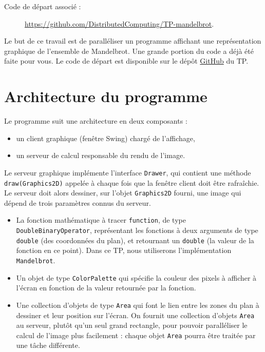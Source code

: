 
\begingroup

\begin{description}
\item[Code de départ associé :] \url{https://github.com/DistributedComputing/TP-mandelbrot}.
\end{description}


Le but de ce travail est de paralléliser un programme affichant une représentation
graphique de l'ensemble de Mandelbrot. Une grande portion du code a déjà été faite pour vous.
Le code de départ est disponible sur le dépôt
\href{https://github.com/DistributedComputing/TP-mandelbrot}{GitHub} du TP.

\section{Architecture du programme}

Le programme suit une architecture en deux composants :
\begin{itemize}
\item un client graphique (fenêtre Swing) chargé de l'affichage,
\item un serveur de calcul responsable du rendu de l'image.
\end{itemize}

Le serveur graphique implémente l'interface \lstinline{Drawer}, qui contient une méthode
\lstinline{draw(Graphics2D)} appelée à chaque fois que la fenêtre client doit être rafraîchie.
Le serveur doit alors dessiner, sur l'objet \lstinline{Graphics2D} fourni, une image
qui dépend de trois paramètres connus du serveur.
\begin{itemize}
\item La fonction mathématique à tracer \lstinline{function}, de type \lstinline{DoubleBinaryOperator},
  représentant les fonctions à deux arguments de type \lstinline{double} (des coordonnées du plan),
  et retournant un \lstinline{double} (la valeur de la fonction en ce point).
  Dans ce TP, nous utiliserons l'implémentation \lstinline{Mandelbrot}.
\item Un objet de type \lstinline{ColorPalette} qui spécifie la couleur des pixels à afficher à l'écran
  en fonction de la valeur retournée par la fonction.
\item Une collection d'objets de type \lstinline{Area} qui font le lien entre les zones du plan à dessiner
  et leur position sur l'écran. On fournit une collection d'objets \lstinline{Area} au serveur,
  plutôt qu'un seul grand rectangle, pour pouvoir paralléliser le calcul de l'image plus facilement :
  chaque objet \lstinline{Area} pourra être traitée par une tâche différente.
\end{itemize}

